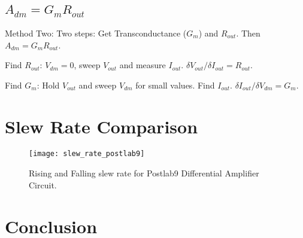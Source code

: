 \documentclass{article}
\begin{document}
\subsection{$A_{dm} = G_{m}R_{out}$}

Method Two:
Two steps: Get Transconductance ($G_{m}$) and $R_{out}$. Then $A_{dm} = G_{m} R_{out}$.

Find $R_{out}$: $V_{dm} = 0$, sweep $V_{out}$ and measure $I_{out}$. $\delta V_{out} / \delta I_{out} = R_{out}$.

Find $G_{m}$: Hold $V_{out}$ and sweep $V_{dm}$ for small values. Find $I_{out}$. $\delta I_{out} / \delta V_{dm} = G_{m}$.


\section{Slew Rate Comparison}

\begin{figure}[ht!]
    \centering
    \texttt{[image: slew\_rate\_postlab9]}
    \caption{Rising and Falling slew rate for Postlab9 Differential Amplifier Circuit.}
    \label{fig:postlab9}
\end{figure}

\section{Conclusion}
\end{document}
